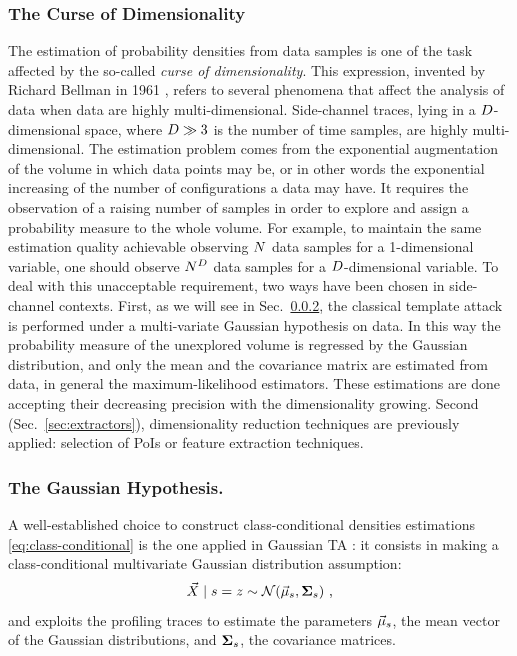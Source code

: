 \subsubsection{The Curse of Dimensionality}
The estimation of probability densities from data samples is one of the task affected by the so-called \emph{curse of dimensionality}. This expression, invented by Richard Bellman in 1961 \cite{bellman2015adaptive}, refers to several phenomena that affect the analysis of data when data are highly multi-dimensional. Side-channel traces, lying in a $D$-dimensional space, where $D\gg 3$ is the number of time samples, are highly multi-dimensional. The estimation problem comes from the exponential augmentation of the volume in which data points may be, or in other words the exponential increasing of the number of configurations a data may have. It requires the observation of a raising number of samples in order to explore and assign a probability measure to the whole volume. For example, to maintain the same estimation quality achievable observing $N$ data samples for a 1-dimensional variable, one should observe $N^D$ data samples for a $D$-dimensional variable. To deal with this unacceptable requirement, two ways have been chosen in side-channel contexts. First, as we will see in Sec.~\ref{sec:gauss_hp}, the classical template attack is performed under a multi-variate Gaussian hypothesis on data. In this way the probability measure of the unexplored volume is regressed by the Gaussian distribution, and only the mean and the covariance matrix are estimated from data, in general \via the  maximum-likelihood estimators. These estimations are done accepting their decreasing precision with the dimensionality growing. Second (Sec.~\ref{sec:extractors}), dimensionality reduction techniques are previously applied: selection of PoIs or feature extraction techniques. 

\subsubsection{The Gaussian Hypothesis.}\label{sec:gauss_hp} A well-established choice to construct class-conditional densities estimations \eqref{eq:class-conditional} is the one applied in Gaussian TA \cite{Chari2003}: it consists in making a class-conditional multivariate Gaussian distribution assumption:
\begin{equation}\label{eq:gaussian_assumption}
\given{\vaLeakVec}{\sensVarGenValue} =\sensVar \sim \mathcal{N}(\mumumu_\sensVarGenValue, \boldsymbol{\Sigma}_\sensVarGenValue)\mbox{ ,}
\end{equation} 
and exploits the profiling traces to estimate the  parameters $\vec{\mu}_s$, \ie the mean vector of the Gaussian distributions, and $ \boldsymbol{\Sigma}_s$, \ie the covariance matrices. \\

